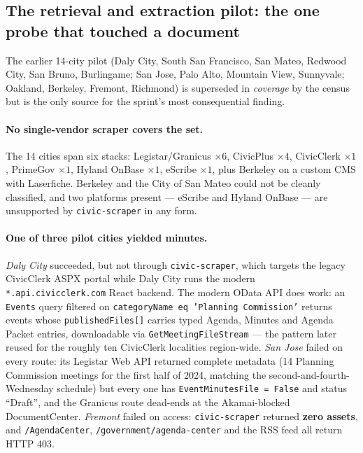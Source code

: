 \documentclass[11pt]{article}
\begin{document}
\subsection{The retrieval and extraction pilot: the one probe that touched a document}

The earlier 14-city pilot (Daly City, South San Francisco, San Mateo, Redwood City, San Bruno,
Burlingame; San Jose, Palo Alto, Mountain View, Sunnyvale; Oakland, Berkeley, Fremont, Richmond)
is superseded in \emph{coverage} by the census but is the only source for the sprint's most
consequential finding.

\paragraph{No single-vendor scraper covers the set.} The 14 cities span six stacks:
Legistar/Granicus $\times 6$, CivicPlus $\times 4$, CivicClerk $\times 1$, PrimeGov $\times 1$,
Hyland OnBase $\times 1$, eScribe $\times 1$, plus Berkeley on a custom CMS with Laserfiche.
Berkeley and the City of San Mateo could not be cleanly classified, and two platforms present ---
eScribe and Hyland OnBase --- are unsupported by \texttt{civic-scraper} in any form.

\paragraph{One of three pilot cities yielded minutes.} \emph{Daly City} succeeded, but not
through \texttt{civic-scraper}, which targets the legacy CivicClerk ASPX portal while Daly City
runs the modern \texttt{*.api.civicclerk.com} React backend. The modern OData API does work: an
\texttt{Events} query filtered on \texttt{categoryName eq 'Planning Commission'} returns events
whose \texttt{publishedFiles[]} carries typed Agenda, Minutes and Agenda Packet entries,
downloadable via \texttt{GetMeetingFileStream} --- the pattern later reused for the roughly ten
CivicClerk localities region-wide. \emph{San Jose} failed on every route: its Legistar Web API
returned complete metadata (14 Planning Commission meetings for the first half of 2024, matching
the second-and-fourth-Wednesday schedule) but every one has \texttt{EventMinutesFile = False} and
status ``Draft'', and the Granicus route dead-ends at the Akamai-blocked DocumentCenter.
\emph{Fremont} failed on access: \texttt{civic-scraper} returned \textbf{zero assets}, and
\texttt{/AgendaCenter}, \texttt{/government/agenda-center} and the RSS feed all return HTTP 403.
\end{document}
